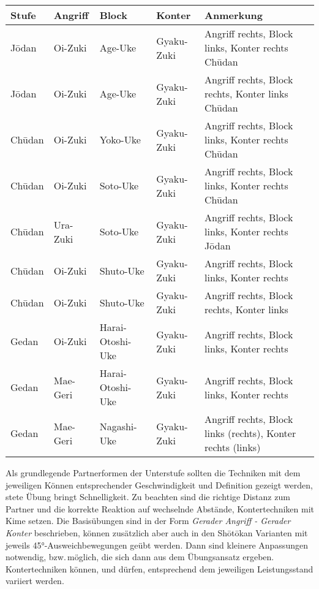 \setcounter{num}{0}
\setcounter{numz}{0}	
\begin{tcolorbox}[width=\textwidth,height=\textheight,right=12pt,left=12pt,colframe=GKD,colback=white,fonttitle=\bfseries,coltitle=white,title=Kihon Ippon Kumite]
	\null\vfill\null
	{\small 	\begin{tabularx}{\textwidth}{llllX}
			\textbf{Stufe} 	& \textbf{Angriff} 	& \textbf{Block}&\textbf{Konter}&Anmerkung\\
			\midrule
			J\={o}dan 	& Oi-Zuki 	& Age-Uke			&Gyaku-Zuki	& Angriff rechts, Block links, Konter rechts Ch\={u}dan \\
			J\={o}dan 	& Oi-Zuki 	& Age-Uke			&Gyaku-Zuki	& Angriff rechts, Block rechts, Konter links Ch\={u}dan \\	
			Ch\={u}dan	& Oi-Zuki	& Yoko-Uke			&Gyaku-Zuki	& Angriff rechts, Block links, Konter rechts Ch\={u}dan \\
			Ch\={u}dan	& Oi-Zuki	& Soto-Uke			&Gyaku-Zuki	& Angriff rechts, Block links, Konter rechts Ch\={u}dan \\
			Ch\={u}dan	& Ura-Zuki	& Soto-Uke			&Gyaku-Zuki	& Angriff rechts, Block links, Konter rechts J\={o}dan \\
			Ch\={u}dan	& Oi-Zuki	& Shuto-Uke			&Gyaku-Zuki	& Angriff rechts, Block links, Konter rechts \\
			Ch\={u}dan	& Oi-Zuki	& Shuto-Uke			&Gyaku-Zuki	& Angriff rechts, Block rechts, Konter links \\
			Gedan		& Oi-Zuki	& Harai-Otoshi-Uke	&Gyaku-Zuki	& Angriff rechts, Block links, Konter rechts  \\
			Gedan		& Mae-Geri	& Harai-Otoshi-Uke	&Gyaku-Zuki	& Angriff rechts, Block links, Konter rechts \\
			Gedan		& Mae-Geri	& Nagashi-Uke		&Gyaku-Zuki	& Angriff rechts, Block links (rechts), Konter rechts (links)\\
			\midrule
	\end{tabularx}}\null\vfill\null
		\begin{center}
			\begin{minipage}[t]{\textwidth-2\tabcolsep}
			{\footnotesize Als grundlegende Partnerformen der Unterstufe sollten die Techniken mit dem jeweiligen Können entsprechender Geschwindigkeit und Definition gezeigt werden, stete Übung bringt Schnelligkeit. Zu beachten sind die richtige Distanz zum Partner und die korrekte Reaktion auf wechselnde Abstände, Kontertechniken mit Kime setzen. Die Basisübungen sind in der Form \textit{Gerader Angriff - Gerader Konter} beschrieben, können zusätzlich aber auch in den Sh\={o}t\={o}kan Varianten mit jeweils 45°-Ausweichbewegungen geübt werden. Dann sind kleinere Anpassungen notwendig, bzw.\,möglich, die sich dann aus dem Übungsansatz ergeben. Kontertechniken können, und dürfen, entsprechend dem jeweiligen Leistungsstand variiert werden.}\onehalfspacing\singlespacing

\end{minipage}
\end{center}
\end{tcolorbox}
